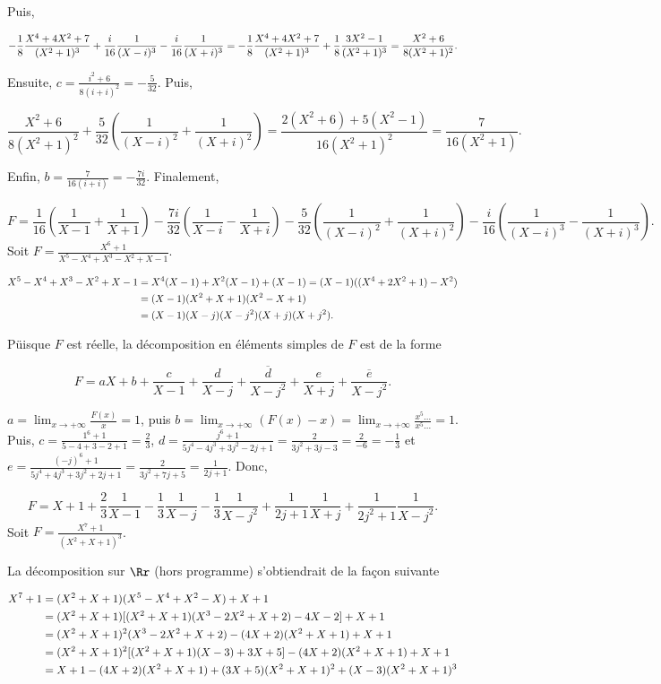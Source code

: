 {{Puis,

\begin{align*}\ensuremath
-\frac{1}{8}\frac{X^4+4X^2+7}{(X^2+1)^3}+\frac{i}{16}\frac{1}{(X-i)^3}-\frac{i}{16}\frac{1}{(X+i)^3}=
-\frac{1}{8}\frac{X^4+4X^2+7}{(X^2+1)^3}+\frac{1}{8}\frac{3X^2-1}{(X^2+1)^3}=\frac{X^2+6}{8(X^2+1)^2}.
\end{align*}

Ensuite, $c=\frac{i^2+6}{8(i+i)^2}=-\frac{5}{32}$. Puis,

$$\frac{X^2+6}{8(X^2+1)^2}+\frac{5}{32}(\frac{1}{(X-i)^2}+\frac{1}{(X+i)^2})
=\frac{2(X^2+6)+5(X^2-1)}{16(X^2+1)^2}=\frac{7}{16(X^2+1)}.$$

Enfin, $b=\frac{7}{16(i+i)}=-\frac{7i}{32}$. Finalement,

$$F=\frac{1}{16}(\frac{1}{X-1}+\frac{1}{X+1})-\frac{7i}{32}(\frac{1}{X-i}-\frac{1}{X+i})-\frac{5}{32}(\frac{1}{(X-i)^2}+\frac{1}{(X+i)^2})-\frac{i}{16}(\frac{1}{(X-i)^3}-\frac{1}{(X+i)^3}).$$
Soit $F=\frac{X^6+1}{X^5-X^4+X^3-X^2+X-1}$.

\begin{align*}\ensuremath
X^5-X^4+X^3-X^2+X-1&=X^4(X-1)+X^2(X-1)+(X-1)=(X-1)((X^4+2X^2+1)-X^2)\\
 &=(X-1)(X^2+X+1)(X^2-X+1)\\
 &=(X-1)(X-j)(X-j^2)(X+j)(X+j^2).
\end{align*}

Püisque $F$ est réelle, la décomposition en éléments simples de $F$ est de la forme

$$F=aX+b+\frac{c}{X-1}+\frac{d}{X-j}+\frac{\overline{d}}{X-j^2}+\frac{e}{X+j}+\frac{\overline{e}}{X-j^2}.$$

$a=\lim_{x\rightarrow +\infty}\frac{F(x)}{x}=1$, puis $b=\lim_{x\rightarrow +\infty}(F(x)-x)=\lim_{x\rightarrow +\infty}\frac{x^5...}{x^5...}=1$. Puis, $c=\frac{1^6+1}{5-4+3-2+1}=\frac{2}{3}$,
$d=\frac{j^6+1}{5j^4-4j^3+3j^2-2j+1}=\frac{2}{3j^2+3j-3}=\frac{2}{-6}=-\frac{1}{3}$ et $e=\frac{(-j)^6+1}{5j^4+4j^3+3j^2+2j+1}=\frac{2}{3j^2+7j+5}=\frac{1}{2j+1}$. Donc,

$$F=X+1+\frac{2}{3}\frac{1}{X-1}-\frac{1}{3}\frac{1}{X-j}-\frac{1}{3}\frac{1}{X-j^2}+\frac{1}{2j+1}\frac{1}{X+j}+\frac{1}{2j^2+1}\frac{1}{X-j^2}.$$
Soit $F=\frac{X^7+1}{(X^2+X+1)^3}$.

La décomposition sur $\Rr$ (hors programme) s'obtiendrait de la façon suivante

\begin{align*}\ensuremath
X^7+1&=(X^2+X+1)(X^5-X^4+X^2-X)+X+1\\
 &=(X^2+X+1)[(X^2+X+1)(X^3-2X^2+X+2)-4X-2]+X+1\\
 &=(X^2+X+1)^2(X^3-2X^2+X+2)-(4X+2)(X^2+X+1)+X+1\\
 &=(X^2+X+1)^2[(X^2+X+1)(X-3)+3X+5]-(4X+2)(X^2+X+1)+X+1\\
 &=X+1-(4X+2)(X^2+X+1)+(3X+5)(X^2+X+1)^2+(X-3)(X^2+X+1)^3
\end{align*}

}}
